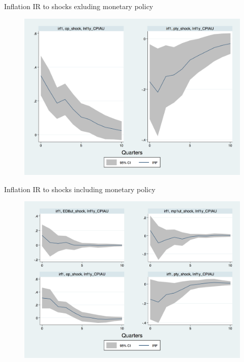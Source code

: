 \documentclass{beamer}
\begin{document}
\begin{frame}{Inflation IR to  shocks exluding monetary policy}

\begin{figure}
	\includegraphics[scale=0.3]{figures/CPIAU_ashocks_nmp.png} 
\end{figure}

\end{frame}


\begin{frame}{Inflation IR to  shocks including monetary policy}

\begin{figure}
	\includegraphics[scale=0.3]{figures/CPIAU_ashocks.png} 
\end{figure}

\end{frame}
\end{document}
